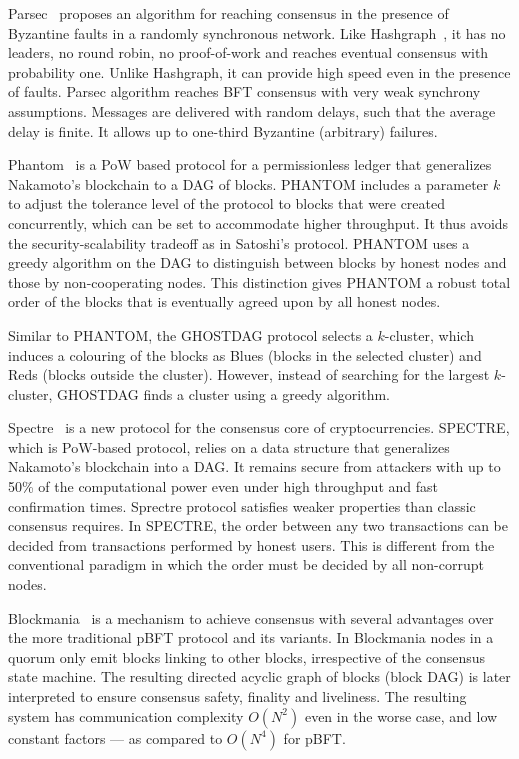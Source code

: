 \documentclass[preprint,12pt]{elsarticle}
\begin{document}
Parsec~\cite{PARSEC18} proposes an algorithm for reaching consensus in the presence of Byzantine faults in a randomly synchronous network. 
Like Hashgraph~\cite{hashgraph16}, it has no leaders, no round robin, no proof-of-work and reaches eventual consensus with probability one. Unlike Hashgraph, it can provide high speed even in the presence of faults. Parsec algorithm reaches BFT consensus with very weak synchrony assumptions. Messages are delivered with random delays, such that the average delay is finite. It allows up to one-third Byzantine (arbitrary) failures.

Phantom~\cite{PHANTOM08} is a PoW based protocol for a permissionless ledger that generalizes Nakamoto’s blockchain to a DAG of blocks. PHANTOM includes a parameter $k$ to adjust the tolerance level of the protocol to blocks that were created concurrently, which can be set to accommodate higher throughput. It thus avoids the security-scalability tradeoff as in Satoshi’s protocol.  PHANTOM uses a greedy algorithm on the DAG to distinguish between blocks by honest nodes and those by non-cooperating nodes. This distinction gives PHANTOM a robust total order of the blocks that is eventually agreed upon by all honest nodes.

Similar to PHANTOM, the GHOSTDAG protocol selects a $k$-cluster, which induces a colouring of the blocks as Blues (blocks in the selected cluster) and Reds (blocks outside the cluster).
 However, instead of searching for the largest $k$-cluster, GHOSTDAG finds a cluster using a greedy algorithm.

Spectre~\cite{sompolinsky2016spectre} is
 a new protocol for the consensus core of cryptocurrencies. SPECTRE, which is PoW-based protocol, relies on a data structure that generalizes Nakamoto’s blockchain into a DAG. It remains secure from attackers with up to 50\% of the computational power even under high throughput and fast confirmation times. Sprectre protocol satisfies weaker properties than classic consensus requires. In SPECTRE, the order between any two transactions can be decided from transactions performed by honest users. This is different from the conventional paradigm in which the order must be decided by all non-corrupt nodes. 
 
 
 
Blockmania~\cite{Blockmania18}
is a mechanism to achieve consensus with several advantages over the more traditional pBFT protocol and its variants. In Blockmania nodes in a quorum only emit blocks linking to other blocks, irrespective of the consensus state machine. The resulting directed acyclic graph of blocks (block DAG) is later interpreted to ensure consensus safety, finality and liveliness.
 The resulting system has communication complexity $O(N^2)$ even in the worse case, and low constant factors — as compared to $O(N^4)$ for pBFT.
            
\end{document}
